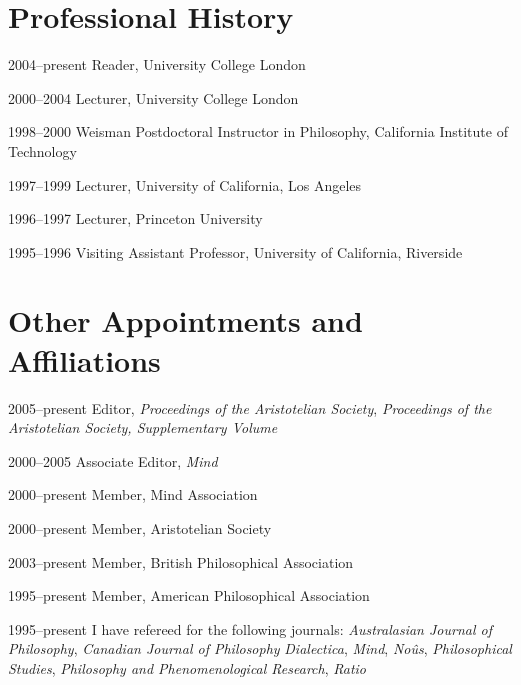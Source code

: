 \documentclass[contbibnum]{cv}
\begin{document}

\section{Professional History}\label{sec:professional_history} %

\begin{topic}
	\item[2004--present] Reader, University College London
	\item[2000--2004] Lecturer, University College London
	\item[1998--2000] Weisman Postdoctoral Instructor in Philosophy, California Institute of Technology
	\item[1997--1999] Lecturer, University of California, Los Angeles
	\item[1996--1997] Lecturer, Princeton University
	\item[1995--1996] Visiting Assistant Professor, University of California, Riverside
\end{topic}


\section{Other Appointments and Affiliations}\label{sec:other_appointments_and_affiliations} %

\begin{topic}
	\item[2005--present] Editor, \emph{Proceedings of the Aristotelian Society}, \emph{Proceedings of the Aristotelian Society, Supplementary Volume}
	\item[2000--2005] Associate Editor, \emph{Mind}
	\item[2000--present] Member, Mind Association
	\item[2000--present] Member, Aristotelian Society
	\item[2003--present] Member, British Philosophical Association
	\item[1995--present] Member, American Philosophical Association
	\item[1995--present] I have refereed for the following journals: \emph{Australasian Journal of Philosophy}, \emph{Canadian Journal of Philosophy} \emph{Dialectica}, \emph{Mind}, \emph{Noûs}, \emph{Philosophical Studies}, \emph{Philosophy and Phenomenological Research}, \emph{Ratio}
\end{topic}
\end{document}
